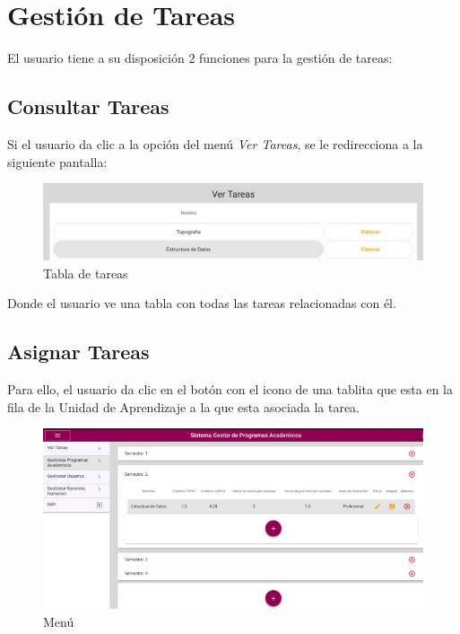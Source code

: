 \section{Gestión de Tareas}
    El usuario tiene a su disposición 2 funciones para la gestión de tareas:
    \subsection{Consultar Tareas}

        Si el usuario da clic a la opción del menú \textit{Ver Tareas}, se le redirecciona a la siguiente pantalla:
        \begin{figure}[H]
            \centering
            \hypertarget{asignart}{\includegraphics[width=0.7\linewidth]{images/Tareas/Vertareas}}
            \caption{Tabla de tareas}
            \label{asignart}
        \end{figure}
        Donde el usuario ve una tabla con todas las tareas relacionadas con él.

    \subsection{Asignar Tareas}

        Para ello, el usuario da clic en el botón con el icono de una tablita que esta en la fila de la Unidad de Aprendizaje a la que esta asociada la tarea.


        \begin{figure}[H]
            \centering
            \hypertarget{menu}{\includegraphics[width=0.7\linewidth]{images/Tareas/Menu}}
            \caption{Menú}
            \label{menu}
        \end{figure}


